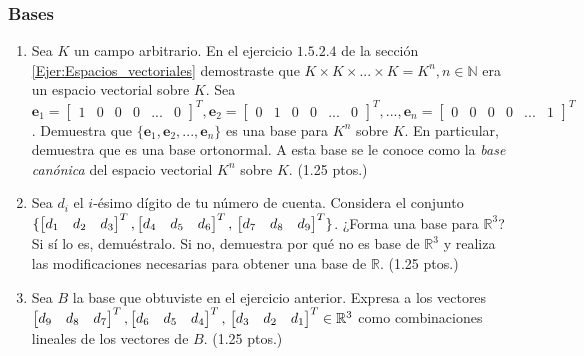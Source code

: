 \documentclass[12pt]{article}
\begin{document}
\subsubsection{Bases}
\begin{enumerate}
    \item Sea $K$ un campo arbitrario. En el ejercicio $1.5.2.4$ de la sección \ref{Ejer:Espacios_vectoriales} demostraste que $K\times K\times ...\times K=K^n, n\in\mathbb{N}$ era un espacio vectorial sobre $K$. Sea $\mathbf{e}_1=\begin{bmatrix} 1 & 0 & 0 & 0 & ... & 0 \end{bmatrix}^T, \mathbf{e}_2=\begin{bmatrix} 0 & 1 & 0 & 0 & ... & 0 \end{bmatrix}^T, ..., \mathbf{e}_n = \begin{bmatrix} 0 & 0 & 0 & 0 & ... & 1 \end{bmatrix}^T$. Demuestra que $\{\mathbf{e}_1, \mathbf{e}_2, ..., \mathbf{e}_n\}$ es una base para $K^n$ sobre $K$. En particular, demuestra que es una base ortonormal. A esta base se le conoce como la \emph{base canónica} del espacio vectorial $K^n$ sobre $K$.  (1.25 ptos.)
    \item Sea $d_i$ el $i$-ésimo dígito de tu número de cuenta. Considera el conjunto $\{\begin{bmatrix} d_1&d_2&d_3 \end{bmatrix}^T, \begin{bmatrix} d_4&d_5&d_6 \end{bmatrix}^T,\\ \begin{bmatrix} d_7&d_8&d_9 \end{bmatrix}^T\}$. ¿Forma una base para $\mathbb{R}^3$? Si sí lo es, demuéstralo. Si no, demuestra por qué no es base de $\mathbb{R}^3$ y realiza las modificaciones necesarias para obtener una base de $\mathbb{R}$. (1.25 ptos.)
    \item Sea $B$ la base que obtuviste en el ejercicio anterior. Expresa a los vectores $\begin{bmatrix} d_9&d_8&d_7 \end{bmatrix}^T , \begin{bmatrix} d_6&d_5&d_4 \end{bmatrix}^T , \\ \begin{bmatrix} d_3&d_2&d_1 \end{bmatrix}^T \in \mathbb{R}^3$ como combinaciones lineales de los vectores de $B$. (1.25 ptos.)
\end{enumerate}
\end{document}
